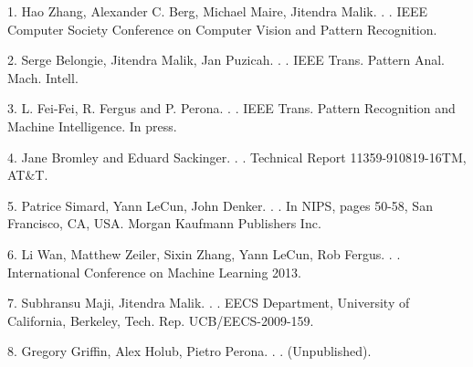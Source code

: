 \documentclass[11pt,letterpaper]{article}
\begin{document}
\begin{thebibliography}{}

1. Hao Zhang, Alexander C. Berg, Michael Maire, Jitendra Malik.
.
.
 IEEE Computer Society Conference on Computer Vision and Pattern Recognition.

2. Serge Belongie, Jitendra Malik, Jan Puzicah.
.
.
\newblock IEEE Trans. Pattern Anal. Mach. Intell.

3. L. Fei-Fei, R. Fergus and P. Perona.
.
.
 IEEE Trans. Pattern Recognition and Machine Intelligence. In press.

4. Jane Bromley and Eduard Sackinger.
.
.
\newblock Technical Report 11359-910819-16TM, AT$\&$T.

5. Patrice Simard, Yann LeCun, John Denker.
.
.
\newblock In NIPS, pages 50-58, San Francisco, CA, USA. Morgan Kaufmann Publishers Inc.

6. Li Wan, Matthew Zeiler, Sixin Zhang, Yann LeCun, Rob Fergus.
.
.
\newblock International Conference on Machine Learning 2013.

7. Subhransu Maji, Jitendra Malik.
.
.
\newblock EECS Department, University of California, Berkeley, Tech. Rep. UCB/EECS-2009-159.

8. Gregory Griffin, Alex Holub, Pietro Perona.
.
.
\newblock (Unpublished).


\end{thebibliography}
\end{document}
